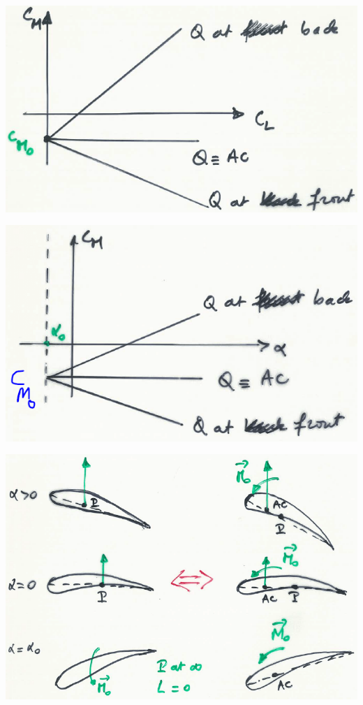 			\begin{center}
			\begin{minipage}{0.33\textwidth}
			\includegraphics[scale=0.23]{ch2/14}
			\end{minipage}
			\begin{minipage}{0.32\textwidth}
			\includegraphics[scale=0.22]{ch2/15}
			\end{minipage}
			\begin{minipage}{0.32\textwidth}
			\includegraphics[scale=0.11]{ch2/16}
			\end{minipage}
			\end{center}
		
